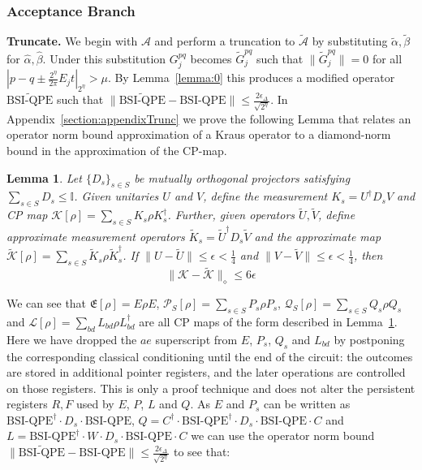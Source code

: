 \documentclass[aps,floatfix,10pt,amssymb,amsfont,amsmath,superscriptaddress,float,nofootinbib,longbibliography,nobalancelastpage,twocolumn]{revtex4-2}
\newtheorem{lemma}{Lemma}
\begin{document}
\begin{widetext}
\subsubsection{Acceptance Branch}
\label{section:accept}
\textbf{Truncate.} We begin with $\mathcal{A}$ and perform a truncation to $\tilde{\mathcal{A}}$ by substituting $\tilde \alpha, \tilde \beta$ for $\hat \alpha, \hat \beta$. Under this substitution $G^{pq}_j$ becomes $\tilde G^{pq}_j$ such that $\|\tilde G^{pq}_j\| =0$ for all $|p-q\pm\frac{2^{\eta}}{2\pi}E_jt|_{2^{\eta}} > \mu$.  By Lemma~\ref{lemma:0} this produces a modified operator $\widetilde{\text{BSI-QPE}}$ such that $\|\widetilde{\text{BSI-QPE}}- \text{BSI-QPE}\| \leq \frac{2\epsilon_{\Delta}}{\sqrt{2^{\eta}}}$. In Appendix~\ref{section:appendixTrunc} we prove the following Lemma that relates an operator norm bound approximation of a Kraus operator to a diamond-norm bound in the approximation of the CP-map.
\begin{lemma}
\label{lemma:3}
Let $\{D_s\}_{s\in S}$ be mutually orthogonal projectors satisfying $\sum_{s\in S} D_s \leq \mathbb{I}$. Given unitaries $U$ and $V$, define the measurement $K_s = U^{\dagger}D_s V$ and CP map $\mathcal{K}[\rho] = \sum_{s \in S} K_s\rho K_s^{\dagger}$. Further, given operators $\tilde U, \tilde V$, define approximate measurement operators $\tilde K_s = \tilde U^{\dagger}D_s \tilde V$ and the approximate map $\tilde{\mathcal{K}}[\rho] = \sum_{s \in S} \tilde K_s\rho \tilde K_s^{\dagger}$. If $\|U-\tilde U\| \leq \epsilon<\frac14$ and $\|V-\tilde V\| \leq \epsilon<\frac14$, then 
\begin{equation}
    \|\mathcal{K} - \tilde{\mathcal{K}}\|_{\diamond} \leq 6\epsilon
\end{equation}
\end{lemma}
We can see that $\mathfrak{E}[\rho] =  E \rho E$, $\mathcal{P}_S[\rho] = \sum_{s\in S} P_s \rho P_s$, $\mathcal{Q}_S[\rho] = \sum_{s\in S} Q_s \rho Q_s$ and $\mathcal{L}[\rho] = \sum_{bd} L_{bd} \rho L^{\dagger}_{bd}$ are all CP maps of the form described in Lemma~\ref{lemma:3}. Here we have dropped the $ae$ superscript from $E$, $P_s$, $Q_s$ and $L_{bd}$ by postponing the corresponding classical conditioning until the end of the circuit: the outcomes are stored in additional pointer registers, and the later operations are controlled on those registers. This is only a proof technique and does not alter the persistent registers $R, F$ used by $E$, $P$, $L$ and $Q$. As $E$ and $P_s$ can be written as $\text{BSI-QPE}^{\dagger}\cdot D_s\cdot\text{BSI-QPE}$, $Q = C^{\dagger}\cdot\text{BSI-QPE}^{\dagger}\cdot D_s\cdot \text{BSI-QPE}\cdot C$ and $L = \text{BSI-QPE}^{\dagger}\cdot W\cdot D_s\cdot \text{BSI-QPE}\cdot C$ we can use the operator norm bound $\|\widetilde{\text{BSI-QPE}}- \text{BSI-QPE}\| \leq \frac{2\epsilon_{\Delta}}{\sqrt{2^{\eta}}}$ to see that:

\end{widetext}
\end{document}
